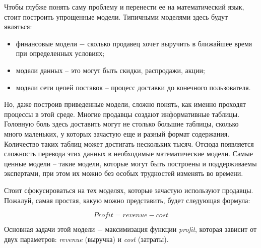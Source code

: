 Чтобы глубже понять саму проблему и перенести ее на математический язык, стоит построить упрощенные модели. Типичными моделями здесь будут являться:
\begin{itemize}
  \item финансовые модели ​− сколько продавец хочет выручить в ближайшее время при определенных условиях;
  \item модели данных – это могут быть скидки, распродажи, акции;
  \item модели сети цепей поставок – процесс доставки до конечного пользователя.
\end{itemize}

Но, даже построив приведенные модели, сложно понять, как именно проходят процессы в этой среде. Многие продавцы создают информативные таблицы. Головную боль здесь доставить могут не столько большие таблицы, сколько много маленьких, у которых зачастую еще и разный формат содержания. Количество таких таблиц может достигать нескольких тысяч. Отсюда появляется сложность перевода этих данных в необходимые математические модели. Самые ценные модели – такие модели, которые могут быть построены и поддерживаемы экспертами, при этом их можно без особых трудностей изменять во времени.

Стоит сфокусироваться на тех моделях, которые зачастую используют продавцы. Пожалуй, самая простая, какую можно представить, будет следующая формула:

\begin{equation}
  Profit = revenue - cost
\end{equation}

Основная задачи этой модели ​− максимизация функции \emph{profit}, которая зависит от двух параметров: \emph{revenue} (выручка) и \emph{cost} (затраты).
